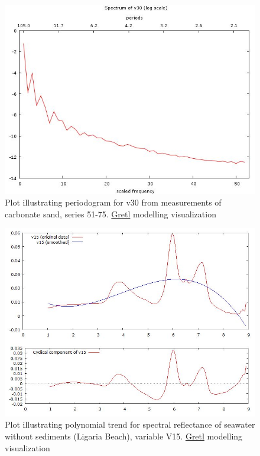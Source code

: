 \documentclass[11pt]{article}
\begin{document}
\begin{appendices}
\begin{figure}[H]
	\begin{center}
		\includegraphics[scale=0.4]{G-period-sand30.jpg}
		\caption{Plot illustrating periodogram for v30 from measurements of carbonate sand, series 51-75. \href{http://gretl.sourceforge.net/}{Gretl} modelling visualization­}\label{fig:A.31}
	\end{center}	
\end{figure}

\begin{figure}[H]
	\begin{center}
		\includegraphics[scale=0.4]{G-polynom-trend-wo.jpg}
		\caption{Plot illustrating polynomial trend for spectral reflectance of seawater without sediments (Ligaria Beach), variable V15. \href{http://gretl.sourceforge.net/}{Gretl} modelling visualization­}
	\end{center}
	\label{fig:A.32}
\end{figure}


\end{appendices}
\end{document}
